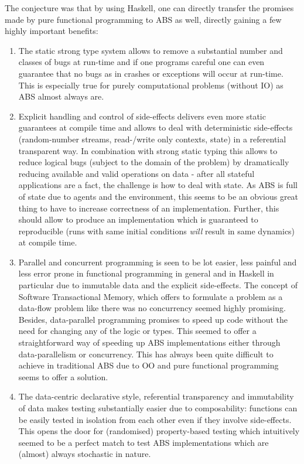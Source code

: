 The conjecture was that by using Haskell, one can directly transfer the promises made by pure functional programming to ABS as well, directly gaining a few highly important benefits:
\begin{enumerate}
	\item The static strong type system allows to remove a substantial number and classes of bugs at run-time and if one programs careful one can even guarantee that no bugs as in crashes or exceptions will occur at run-time. This is especially true for purely computational problems (without IO) as ABS almost always are.
	
	\item Explicit handling and control of side-effects delivers even more static guarantees at compile time and allows to deal with deterministic side-effects (random-number streams, read-/write only contexts, state) in a referential transparent way. In combination with strong static typing this allows to reduce logical bugs (subject to the domain of the problem) by dramatically reducing available and valid operations on data - after all stateful applications are a fact, the challenge is how to deal with state. As ABS is full of state due to agents and the environment, this seems to be an obvious great thing to have to increase correctness of an implementation. Further, this should allow to produce an implementation which is guaranteed to reproducible (runs with same initial conditions \textit{will} result in same dynamics) at compile time.
	
	\item Parallel and concurrent programming is seen to be lot easier, less painful and less error prone in functional programming in general and in Haskell in particular due to immutable data and the explicit side-effects. The concept of Software Transactional Memory, which offers to formulate a problem as a data-flow problem like there was no concurrency seemed highly promising. Besides, data-parallel programming promises to speed up code without the need for changing any of the logic or types. This seemed to offer a straightforward way of speeding up ABS implementations either through data-parallelism or concurrency. This has always been quite difficult to achieve in traditional ABS due to OO and pure functional programming seems to offer a solution.
	
	\item The data-centric declarative style, referential transparency and immutability of data makes testing substantially easier due to composability: functions can be easily tested in isolation from each other even if they involve side-effects. This opens the door for (randomised) property-based testing which intuitively seemed to be a perfect match to test ABS implementations which are (almost) always stochastic in nature.
\end{enumerate}

